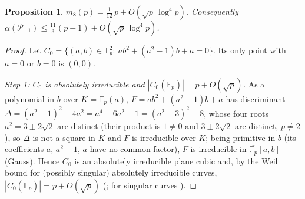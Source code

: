 \documentclass[11pt]{article}
\newtheorem{proposition}[theorem]{Proposition}
\theoremstyle{remark}
\newcommand{\Fp}{\mathbb{F}_p}
\newcommand{\Pset}{\mathcal{P}}
\begin{document}
\begin{proposition}\label{prop:m8asym}
$m_8(p)=\tfrac{1}{12}\,p+O(\sqrt p\,\log^4p)$.  Consequently $\alpha(\Pset_{-1})\le\tfrac{11}{3}(p-1)+O(\sqrt p\,\log^4p)$.
\end{proposition}
\begin{proof}
Let $C_0=\{(a,b)\in\Fp^2:\ ab^2+(a^2-1)b+a=0\}$.  Its only point with $a=0$ or $b=0$ is $(0,0)$.

\emph{Step 1: $C_0$ is absolutely irreducible and $|C_0(\Fp)|=p+O(\sqrt p)$.}  As a polynomial in $b$ over $K=\overline{\Fp}(a)$,
$F=ab^2+(a^2-1)b+a$ has discriminant $\Delta=(a^2-1)^2-4a^2=a^4-6a^2+1=(a^2-3)^2-8$, whose four roots $a^2=3\pm2\sqrt2$ are distinct
(their product is $1\ne0$ and $3\pm2\sqrt2$ are distinct, $p\ne2$), so $\Delta$ is not a square in $K$ and $F$ is irreducible over $K$;
being primitive in $b$ (its coefficients $a$, $a^2-1$, $a$ have no common factor), $F$ is irreducible in $\overline{\Fp}[a,b]$ (Gauss).
Hence $C_0$ is an absolutely irreducible plane cubic and, by the Weil bound for (possibly singular) absolutely irreducible curves,
$|C_0(\Fp)|=p+O(\sqrt p)$ (\cite[Ch.~11]{IK}; for singular curves \cite{AubryPerret}).


\end{proof}
\end{document}

